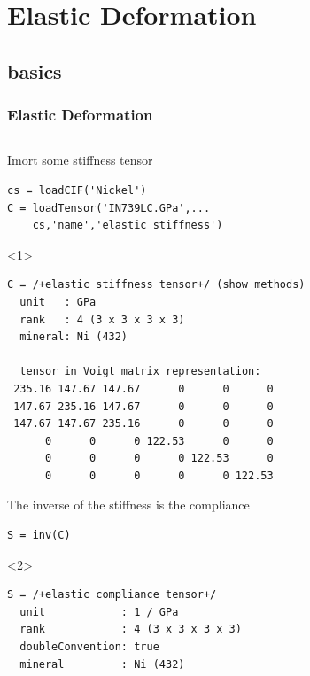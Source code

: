 \documentclass[compress]{beamer}
\begin{document}
\section{Elastic Deformation}
\label{sec:elasticity}

\subsection*{basics}

\begin{frame}[fragile]
  \frametitle{Elastic Deformation}

  \begin{columns}
    \begin{column}{0.65\textwidth}
      \begin{overlayarea}{\textwidth}{\textheight}
        Imort some stiffness tensor
        \vspace{-0.2cm}
      \begin{lstlisting}[style=input]
cs = loadCIF('Nickel')
C = loadTensor('IN739LC.GPa',...
    cs,'name','elastic stiffness')
\end{lstlisting}
\begin{onlyenv}<1>
  \vspace{-0.3cm}
  \begin{lstlisting}[style=output]
C = /+elastic stiffness tensor+/ (show methods)
  unit   : GPa
  rank   : 4 (3 x 3 x 3 x 3)
  mineral: Ni (432)

  tensor in Voigt matrix representation:
 235.16 147.67 147.67      0      0      0
 147.67 235.16 147.67      0      0      0
 147.67 147.67 235.16      0      0      0
      0      0      0 122.53      0      0
      0      0      0      0 122.53      0
      0      0      0      0      0 122.53
  \end{lstlisting}
\end{onlyenv}

\pause

The inverse of the stiffness is the compliance
\vspace{-0.2cm}
\begin{lstlisting}[style=input]
S = inv(C)
\end{lstlisting}

\begin{onlyenv}<2>
  \vspace{-0.3cm}
  \begin{lstlisting}[style=output]
S = /+elastic compliance tensor+/
  unit            : 1 / GPa
  rank            : 4 (3 x 3 x 3 x 3)
  doubleConvention: true
  mineral         : Ni (432)


\end{lstlisting}
\end{onlyenv}
\end{overlayarea}
\end{column}
\end{columns}
\end{frame}
\end{document}
